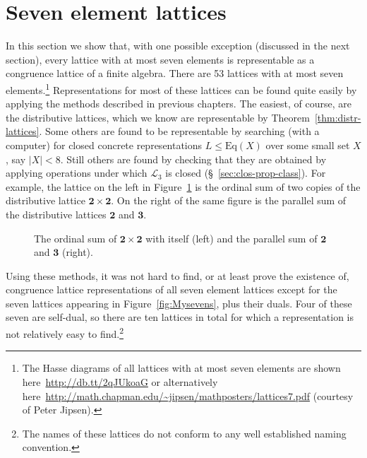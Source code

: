 \documentclass[cm,dissertation]{uhthesis}
\theoremstyle{plain}
\theoremstyle{definition}
\theoremstyle{remark}
\numberwithin{theorem}{section}
\numberwithin{claim}{chapter}
\numberwithin{equation}{section}
\numberwithin{conjecture}{chapter}
\newcommand{\<}{\ensuremath{\langle}}
\renewcommand{\>}{\ensuremath{\rangle}}
\renewcommand{\leq}{\ensuremath{\leqslant}}
\newcommand{\Eq}{\ensuremath{\mathrm{Eq}}}
\newcommand{\0}{\ensuremath{\mathbf{0}}}
\newcommand{\1}{\ensuremath{\mathbf{1}}}
\newcommand{\2}{\ensuremath{\mathbf{2}}}
\newcommand{\3}{\ensuremath{\mathbf{3}}}
\newcommand{\4}{\ensuremath{\mathbf{4}}}
\newcommand{\5}{\ensuremath{\mathbf{5}}}
\newcommand{\sL}{\ensuremath{\mathscr{L}}}
\begin{document}
\section{Seven element lattices}
\label{sec:seven-elem-latt}
In this section we show that, with one possible exception (discussed in the next
section), every lattice with at 
most seven elements is representable as a congruence lattice of a finite algebra.
There are 53 lattices with at most seven elements.\footnote{The Hasse diagrams
  of all lattices with at most seven elements are shown
  here~\url{http://db.tt/2qJUkoaG}
or alternatively here~\url{http://math.chapman.edu/~jipsen/mathposters/lattices7.pdf} (courtesy of 
Peter Jipsen).}
Representations for most of these lattices can be found 
quite easily by applying the methods described in previous chapters.
The easiest, of course, are the distributive lattices, which we know are
representable by Theorem~\ref{thm:distr-lattices}.
Some others are found to be representable by searching (with a computer) for closed concrete
representations $L \leq \Eq(X)$ over some small set $X$, say $|X|<8$.
Still others are found by checking that they are obtained by applying
operations under which $\sL_3$ is closed (\S~\ref{sec:clos-prop-class}).  For
%
example, the lattice on the left in Figure~\ref{fig:ordinal-and-parallel-ex} is
%
%
the ordinal sum of two copies of the distributive lattice $\2 \times \2$.  On
the right of the same figure is the parallel sum of the distributive lattices
$\2$ and $\3$. 
\begin{figure}[h!]
\begin{multicols}{2}
\hskip4cm
  \begin{tikzpicture}[scale=.55]
    
  \end{tikzpicture}
  \par \vfill \columnbreak
\hskip1cm
  \begin{tikzpicture}[scale=.5]
    
  \end{tikzpicture}
\end{multicols}
  \caption{The ordinal sum of $\2\times \2$ with itself (left) and the parallel
    sum of $\2$ and $\3$ (right).}
  \label{fig:ordinal-and-parallel-ex}
\end{figure}

Using these methods, it was not hard to find, or at least prove the existence of,
congruence lattice representations of all seven element lattices except for the
seven lattices appearing in Figure~\ref{fig:Mysevens}, plus their duals.  Four of these
seven are self-dual, so there are ten lattices in total for which a
representation is not relatively easy to find.\footnote{The names of these lattices
  do not conform to any well established naming convention.} 
\end{document}
